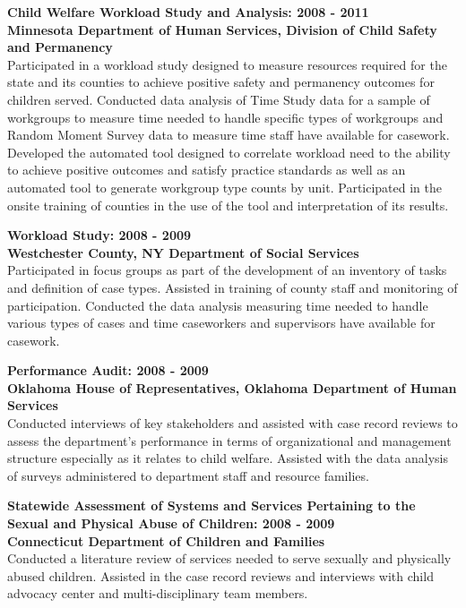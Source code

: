 \documentclass[line, margin, 10pt]{res}
\begin{document}
\begin{resume}
  {\bf Child Welfare Workload Study and Analysis: 2008 - 2011} \\
  {\bf Minnesota Department of Human Services, Division of Child Safety and
    Permanency} \\
  Participated in a workload study designed to measure resources
  required for the state and its counties to achieve positive safety and
  permanency outcomes for children served. Conducted data analysis of
  Time Study data for a sample of workgroups to measure time needed to
  handle specific types of workgroups and Random Moment Survey data to
  measure time staff have available for casework.  Developed the
  automated tool designed to correlate workload need to the ability to
  achieve positive outcomes and satisfy practice standards as well as an
  automated tool to generate workgroup type counts by unit.
  Participated in the onsite training of counties in the use of the tool
  and interpretation of its results.

  {\bf Workload Study: 2008 - 2009} \\
  {\bf Westchester County, NY Department of Social Services} \\
  Participated in focus groups as part of the
  development of an inventory of tasks and definition of case
  types. Assisted in training of county staff and monitoring of
  participation.  Conducted the data analysis measuring time needed to
  handle various types of cases and time caseworkers and supervisors
  have available for casework.

  {\bf Performance Audit: 2008 - 2009} \\
  {\bf Oklahoma House of Representatives, Oklahoma Department of Human
    Services} \\
  Conducted interviews of key stakeholders and assisted with case
  record reviews to assess the department's performance in terms of
  organizational and management structure especially as it relates to
  child welfare.  Assisted with the data analysis of surveys
  administered to department staff and resource families.

  {\bf Statewide Assessment of Systems and Services Pertaining to the
    Sexual and Physical Abuse of Children: 2008 - 2009} \\
  {\bf Connecticut Department of Children and Families} \\
  Conducted a literature review of services needed to serve sexually
  and physically abused children.  Assisted in the case record reviews
  and interviews with child advocacy center and multi-disciplinary
  team members.


\end{resume}
\end{document}
